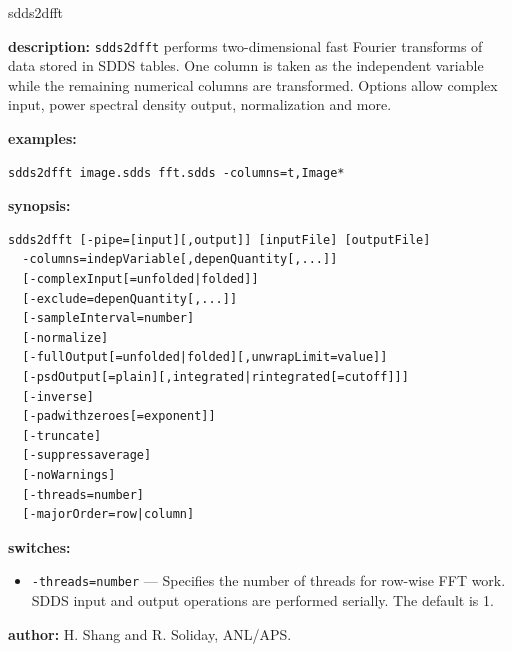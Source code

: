\newpage
\begin{sddsprog}{sdds2dfft}
  \item \textbf{description:} {\tt sdds2dfft} performs two-dimensional fast Fourier transforms of data stored in SDDS tables. One column is taken as the independent variable while the remaining numerical columns are transformed. Options allow complex input, power spectral density output, normalization and more.
  \item \textbf{examples:}
    \begin{verbatim}
sdds2dfft image.sdds fft.sdds -columns=t,Image*
    \end{verbatim}
  \item \textbf{synopsis:}
    \begin{verbatim}
sdds2dfft [-pipe=[input][,output]] [inputFile] [outputFile]
  -columns=indepVariable[,depenQuantity[,...]]
  [-complexInput[=unfolded|folded]]
  [-exclude=depenQuantity[,...]]
  [-sampleInterval=number]
  [-normalize]
  [-fullOutput[=unfolded|folded][,unwrapLimit=value]]
  [-psdOutput[=plain][,integrated|rintegrated[=cutoff]]]
  [-inverse]
  [-padwithzeroes[=exponent]]
  [-truncate]
  [-suppressaverage]
  [-noWarnings]
  [-threads=number]
  [-majorOrder=row|column]
    \end{verbatim}
  \item \textbf{switches:}
    \begin{itemize}
      \item \verb|-threads=number| --- Specifies the number of threads for row-wise FFT work. SDDS input and output operations are performed serially. The default is 1.
    \end{itemize}
  \item \textbf{author:} H. Shang and R. Soliday, ANL/APS.
\end{sddsprog}
